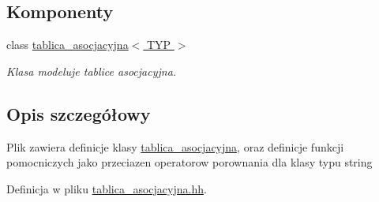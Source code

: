 \subsection*{Komponenty}
\begin{DoxyCompactItemize}
\item 
class \hyperlink{classtablica__asocjacyjna}{tablica\-\_\-asocjacyjna$<$ T\-Y\-P $>$}
\begin{DoxyCompactList}\small\item\em Klasa modeluje tablice asocjacyjna. \end{DoxyCompactList}\end{DoxyCompactItemize}


\subsection{Opis szczegółowy}
Plik zawiera definicje klasy \hyperlink{classtablica__asocjacyjna}{tablica\-\_\-asocjacyjna}, oraz definicje funkcji pomocniczych jako przeciazen operatorow porownania dla klasy typu string 

Definicja w pliku \hyperlink{tablica__asocjacyjna_8hh_source}{tablica\-\_\-asocjacyjna.\-hh}.

